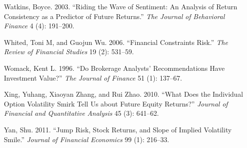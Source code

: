 \documentclass[
  letterpaper,
  DIV=11,
  numbers=noendperiod]{scrreprt}
\newlength{\cslhangindent}
\newlength{\cslentryspacingunit} %
\newenvironment{CSLReferences}[2] %
 {%
  \setlength{\parindent}{0pt}
  \ifodd #1
  \let\oldpar\par
  \def\par{\hangindent=\cslhangindent\oldpar}
  \fi
  \setlength{\parskip}{#2\cslentryspacingunit}
 }%
 {}
\begin{document}
\begin{CSLReferences}{1}{0}
\leavevmode{}%
Watkins, Boyce. 2003. {``Riding the Wave of Sentiment: An Analysis of
Return Consistency as a Predictor of Future Returns.''} \emph{The
Journal of Behavioral Finance} 4 (4): 191--200.

\leavevmode{}%
Whited, Toni M, and Guojun Wu. 2006. {``Financial Constraints Risk.''}
\emph{The Review of Financial Studies} 19 (2): 531--59.

\leavevmode{}%
Womack, Kent L. 1996. {``Do Brokerage Analysts' Recommendations Have
Investment Value?''} \emph{The Journal of Finance} 51 (1): 137--67.

\leavevmode{}%
Xing, Yuhang, Xiaoyan Zhang, and Rui Zhao. 2010. {``What Does the
Individual Option Volatility Smirk Tell Us about Future Equity
Returns?''} \emph{Journal of Financial and Quantitative Analysis} 45
(3): 641--62.

\leavevmode{}%
Yan, Shu. 2011. {``Jump Risk, Stock Returns, and Slope of Implied
Volatility Smile.''} \emph{Journal of Financial Economics} 99 (1):
216--33.

\end{CSLReferences}
\end{document}
